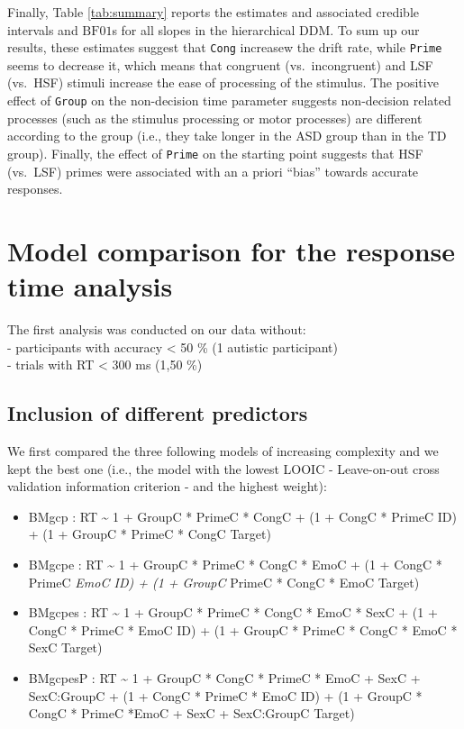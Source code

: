 \documentclass[
  11pt,
  english,
  ,doc,floatsintext]{apa6}
\begin{document}
Finally, Table \ref{tab:summary} reports the estimates and associated credible intervals and \(\text{BF01}\)s for all slopes in the hierarchical DDM. To sum up our results, these estimates suggest that \texttt{Cong} increasew the drift rate, while \texttt{Prime} seems to decrease it, which means that congruent (vs.~incongruent) and LSF (vs.~HSF) stimuli increase the ease of processing of the stimulus. The positive effect of \texttt{Group} on the non-decision time parameter suggests non-decision related processes (such as the stimulus processing or motor processes) are different according to the group (i.e., they take longer in the ASD group than in the TD group). Finally, the effect of \texttt{Prime} on the starting point suggests that HSF (vs.~LSF) primes were associated with an a priori ``bias'' towards accurate responses.

\hypertarget{model-comparison-for-the-response-time-analysis}{%
\section{Model comparison for the response time analysis}\label{model-comparison-for-the-response-time-analysis}}

The first analysis was conducted on our data without:\\
- participants with accuracy \textless{} 50 \% (1 autistic participant)\\
- trials with RT \textless{} 300 ms (1,50 \%)

\hypertarget{inclusion-of-different-predictors}{%
\subsection{Inclusion of different predictors}\label{inclusion-of-different-predictors}}

We first compared the three following models of increasing complexity and we kept the best one (i.e., the model with the lowest LOOIC - Leave-on-out cross validation information criterion - and the highest weight):

\begin{itemize}
\item
  BMgcp : RT \textasciitilde{} 1 + GroupC * PrimeC * CongC + (1 + CongC * PrimeC \textbar\textbar{} ID) + (1 +
  GroupC * PrimeC * CongC \textbar\textbar{} Target)
\item
  BMgcpe : RT \textasciitilde{} 1 + GroupC * PrimeC * CongC * EmoC + (1 + CongC * PrimeC \emph{
  EmoC \textbar\textbar{} ID) + (1 + GroupC } PrimeC * CongC * EmoC \textbar\textbar{} Target)
\item
  BMgcpes : RT \textasciitilde{} 1 + GroupC * PrimeC * CongC * EmoC * SexC + (1 + CongC * PrimeC * EmoC \textbar\textbar{} ID) + (1 + GroupC * PrimeC * CongC * EmoC * SexC \textbar\textbar{} Target)
\item
  BMgcpesP : RT \textasciitilde{} 1 + GroupC * CongC * PrimeC * EmoC + SexC + SexC:GroupC + (1 + CongC * PrimeC * EmoC \textbar\textbar{} ID) + (1 + GroupC * CongC * PrimeC *EmoC + SexC + SexC:GroupC\textbar\textbar{} Target)
\end{itemize}
\end{document}

